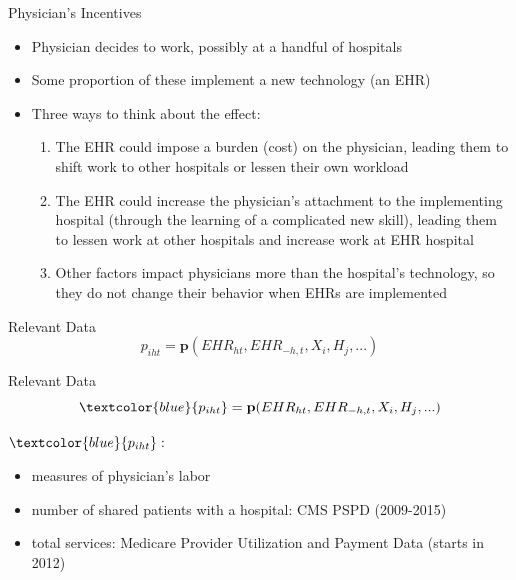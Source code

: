 \documentclass[10pt]{beamer}
\begin{document}
\begin{frame}{Physician's Incentives}
\begin{itemize}
    \item Physician decides to work, possibly at a handful of hospitals
    \item Some proportion of these implement a new technology (an EHR)
    \item Three ways to think about the effect:
    \begin{enumerate}
        \item The EHR could impose a burden (cost) on the physician, leading them to shift work to other hospitals or lessen their own workload
        \item The EHR could increase the physician's attachment to the implementing hospital (through the learning of a complicated new skill), leading them to lessen work at other hospitals and increase work at EHR hospital
        \item Other factors impact physicians more than the hospital's technology, so they do not change their behavior when EHRs are implemented
    \end{enumerate}
\end{itemize}
\end{frame}

\begin{frame}{Relevant Data}
    \begin{equation*}
    p_{iht}=\textbf{p}(EHR_{ht},EHR_{-h,t},X_i,H_j,...)
\end{equation*}
\end{frame}

\begin{frame}[noframenumbering]{Relevant Data}
\begin{equation*}
    \textcolor{blue}{p_{iht}}=\textbf{p}(EHR_{ht},EHR_{-h,t},X_i,H_j,...)
\end{equation*}

$\textcolor{blue}{p_{iht}}:$
\begin{itemize}
    \item measures of physician's labor
    \item number of shared patients with a hospital: CMS PSPD (2009-2015)
    \item total services: Medicare Provider Utilization and Payment Data (starts in 2012)
\end{itemize}
\end{frame}
\end{document}
